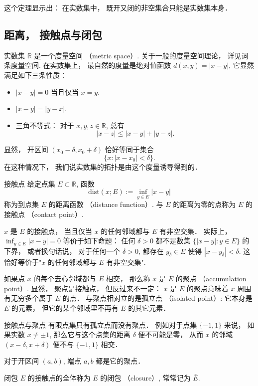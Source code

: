 这个定理显示出： 在实数集中， 既开又闭的非空集合只能是实数集本身．

\subsection{距离， 接触点与闭包}
实数集 $\mathbb{R}$ 是一个度量空间 （metric space）. 关于一般的度量空间理论， 详见词条度量空间. 在实数集上， 最自然的度量是绝对值函数 $d(x,y)=|x-y|$, 它显然满足如下三条性质：

\begin{itemize}
\item $|x-y|=0$ 当且仅当 $x=y$.
\item $|x-y|=|y-x|$.
\item 三角不等式： 对于 $x,y,z\in\mathbb{R}$, 总有
$$
|x-z|\leq|x-y|+|y-z|.
$$
\end{itemize}

显然， 开区间 $(x_0-\delta,x_0+\delta)$ 恰好等同于集合
$$
\{x:|x-x_0|<\delta\}.
$$
在这种情况下， 我们说实数集的拓扑是由这个度量诱导得到的．

\begin{definition}{接触点}
给定点集 $E\subset\mathbb{R}$, 函数
$$
\text{dist}(x;E):=\inf_{y\in E}|x-y|
$$
称为到点集 $E$ 的距离函数 （distance function）. 与 $E$ 的距离为零的点称为 $E$ 的接触点 （contact point）. 
\end{definition}
$x$ 是 $E$ 的接触点， 当且仅当 $x$ 的任何邻域都与 $E$ 有非空交集． 实际上， $\inf_{y\in E}|x-y|=0$ 等价于如下命题： 任何 $\delta>0$ 都不是数集 $\{|x-y|:y\in E\}$ 的下界， 或者换句话说， 对于任何一个 $\delta>0$, 都存在 $y_\delta\in E$ 使得 $|x-y_\delta|<\delta$. 这恰好等价于"$x$ 的任何邻域都与 $E$ 有非空交集".

如果点 $x$ 的每个去心邻域都与 $E$ 相交， 那么称 $x$ 是 $E$ 的聚点 （accumulation point）. 显然， 聚点是接触点， 但反过来不一定： $x$ 是 $E$ 的聚点意味着 $x$ 周围有无穷多个属于 $E$ 的点． 与聚点相对立的是孤立点 （isolated point）: 它本身是 $E$ 的元素， 但它的某个邻域里不再有 $E$ 的其它元素．

\begin{example}{接触点与聚点}
有限点集只有孤立点而没有聚点． 例如对于点集 $\{-1,1\}$ 来说， 如果实数 $x\neq\pm1$, 那么它与这个点集的距离 $\delta$ 便不可能是零， 从而 $x$ 的邻域 $(x-\delta,x+\delta)$ 便不与 $\{-1,1\}$ 相交．

对于开区间 $(a,b)$, 端点 $a,b$ 都是它的聚点．
\end{example}

\begin{definition}{闭包}
$E$ 的接触点的全体称为 $E$ 的闭包 （closure）, 常常记为 $\bar E$.
\end{definition}

